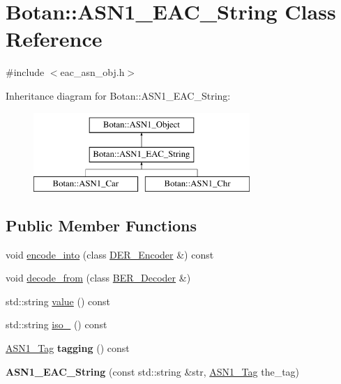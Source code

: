 \hypertarget{classBotan_1_1ASN1__EAC__String}{\section{Botan\-:\-:A\-S\-N1\-\_\-\-E\-A\-C\-\_\-\-String Class Reference}
\label{classBotan_1_1ASN1__EAC__String}
}


{\ttfamily \#include $<$eac\-\_\-asn\-\_\-obj.\-h$>$}

Inheritance diagram for Botan\-:\-:A\-S\-N1\-\_\-\-E\-A\-C\-\_\-\-String\-:\begin{figure}[H]
\begin{center}
\leavevmode
\includegraphics[height=3.000000cm]{classBotan_1_1ASN1__EAC__String}
\end{center}
\end{figure}
\subsection*{Public Member Functions}
\begin{DoxyCompactItemize}
\item 
void \hyperlink{classBotan_1_1ASN1__EAC__String_abe968aa9afdd8fd33bbbaf8cc61b7195}{encode\-\_\-into} (class \hyperlink{classBotan_1_1DER__Encoder}{D\-E\-R\-\_\-\-Encoder} \&) const 
\item 
void \hyperlink{classBotan_1_1ASN1__EAC__String_a480382d36b36cbab25b2cb8bdbeb9a3c}{decode\-\_\-from} (class \hyperlink{classBotan_1_1BER__Decoder}{B\-E\-R\-\_\-\-Decoder} \&)
\item 
std\-::string \hyperlink{classBotan_1_1ASN1__EAC__String_a926f73f09eac8fb5c0d60a27a80e3a94}{value} () const 
\item 
std\-::string \hyperlink{classBotan_1_1ASN1__EAC__String_a79616e5c4821848dc3ab36c156845772}{iso\-\_} () const 
\item 
\hypertarget{classBotan_1_1ASN1__EAC__String_a570c5b02dce8d541d5caa66f92343859}{\hyperlink{namespaceBotan_aaa08f67a945ef195fa39e62659dffa7a}{A\-S\-N1\-\_\-\-Tag} {\bfseries tagging} () const }\label{classBotan_1_1ASN1__EAC__String_a570c5b02dce8d541d5caa66f92343859}

\item 
\hypertarget{classBotan_1_1ASN1__EAC__String_ae8c96ddf642e83c0487089dddabea98d}{{\bfseries A\-S\-N1\-\_\-\-E\-A\-C\-\_\-\-String} (const std\-::string \&str, \hyperlink{namespaceBotan_aaa08f67a945ef195fa39e62659dffa7a}{A\-S\-N1\-\_\-\-Tag} the\-\_\-tag)}\label{classBotan_1_1ASN1__EAC__String_ae8c96ddf642e83c0487089dddabea98d}

\end{DoxyCompactItemize}
